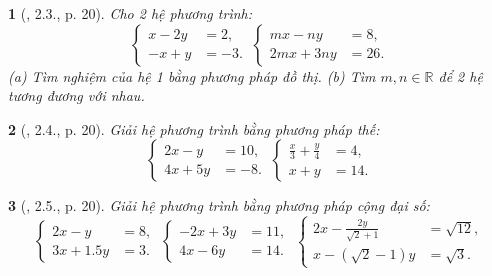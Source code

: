 \documentclass{article}
\newtheorem{baitoan}{}
\begin{document}
\begin{baitoan}[\cite{Binh_boi_duong_Toan_9_tap_2}, 2.3., p. 20]
	Cho 2 hệ phương trình:
	\begin{equation*}
		\left\{\begin{split}
			x - 2y &= 2,\\
			-x + y &= -3.
		\end{split}\right.\ 
		\left\{\begin{split}
			mx - ny &= 8,\\
			2mx + 3ny &= 26.
		\end{split}\right.
	\end{equation*}
	(a) Tìm nghiệm của hệ 1 bằng phương pháp đồ thị. (b) Tìm $m,n\in\mathbb{R}$ để 2 hệ tương đương với nhau.
\end{baitoan}

\begin{baitoan}[\cite{Binh_boi_duong_Toan_9_tap_2}, 2.4., p. 20]
	Giải hệ phương trình bằng phương pháp thế:
	\begin{equation*}
		\left\{\begin{split}
			2x - y &= 10,\\
			4x + 5y &= -8.
		\end{split}\right.\ 
		\left\{\begin{split}
			\frac{x}{3} + \frac{y}{4} &= 4,\\
			x + y &= 14.
		\end{split}\right.
	\end{equation*}
\end{baitoan}

\begin{baitoan}[\cite{Binh_boi_duong_Toan_9_tap_2}, 2.5., p. 20]
	Giải hệ phương trình bằng phương pháp cộng đại số:
	\begin{equation*}
		\left\{\begin{split}
			2x - y &= 8,\\
			3x + 1.5y &= 3.
		\end{split}\right.\ 
		\left\{\begin{split}
			-2x + 3y &= 11,\\
			4x - 6y &= 14.
		\end{split}\right.\ 
		\left\{\begin{split}
			2x - \frac{2y}{\sqrt{2} + 1} &= \sqrt{12},\\
			x - (\sqrt{2} - 1)y &= \sqrt{3}.
		\end{split}\right.
	\end{equation*}
\end{baitoan}
\end{document}
